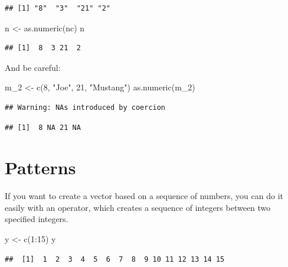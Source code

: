 \documentclass[
]{book}
\newenvironment{Shaded}{\begin{snugshade}}{\end{snugshade}}
\newcommand{\DecValTok}[1]{\textcolor[rgb]{0.00,0.00,0.81}{#1}}
\newcommand{\FunctionTok}[1]{\textcolor[rgb]{0.00,0.00,0.00}{#1}}
\newcommand{\NormalTok}[1]{#1}
\newcommand{\OtherTok}[1]{\textcolor[rgb]{0.56,0.35,0.01}{#1}}
\newcommand{\SpecialCharTok}[1]{\textcolor[rgb]{0.00,0.00,0.00}{#1}}
\newcommand{\StringTok}[1]{\textcolor[rgb]{0.31,0.60,0.02}{#1}}
\theoremstyle{definition}
\theoremstyle{definition}
\theoremstyle{definition}
\theoremstyle{definition}
\theoremstyle{remark}
\begin{document}
\begin{verbatim}
## [1] "8"  "3"  "21" "2"
\end{verbatim}

\begin{Shaded}
\begin{Highlighting}[]
\NormalTok{n }\OtherTok{\textless{}{-}} \FunctionTok{as.numeric}\NormalTok{(nc)}
\NormalTok{n}
\end{Highlighting}
\end{Shaded}

\begin{verbatim}
## [1]  8  3 21  2
\end{verbatim}

And be careful:

\begin{Shaded}
\begin{Highlighting}[]
\NormalTok{m\_2 }\OtherTok{\textless{}{-}} \FunctionTok{c}\NormalTok{(}\DecValTok{8}\NormalTok{, }\StringTok{"Joe"}\NormalTok{, }\DecValTok{21}\NormalTok{, }\StringTok{"Mustang"}\NormalTok{)}
\FunctionTok{as.numeric}\NormalTok{(m\_2)}
\end{Highlighting}
\end{Shaded}

\begin{verbatim}
## Warning: NAs introduced by coercion
\end{verbatim}

\begin{verbatim}
## [1]  8 NA 21 NA
\end{verbatim}

\hypertarget{patterns}{%
\section{Patterns}\label{patterns}}

If you want to create a vector based on a sequence of numbers, you can do it easily with an operator, which creates a sequence of integers between two specified integers.

\begin{Shaded}
\begin{Highlighting}[]
\NormalTok{y }\OtherTok{\textless{}{-}} \FunctionTok{c}\NormalTok{(}\DecValTok{1}\SpecialCharTok{:}\DecValTok{15}\NormalTok{)}
\NormalTok{y}
\end{Highlighting}
\end{Shaded}

\begin{verbatim}
##  [1]  1  2  3  4  5  6  7  8  9 10 11 12 13 14 15
\end{verbatim}
\end{document}
